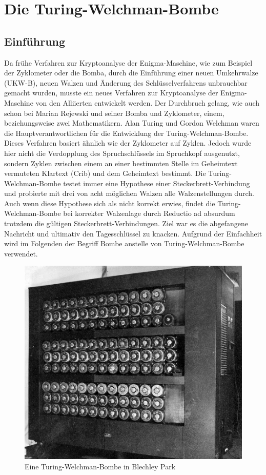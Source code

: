 \chapter{Die Turing-Welchman-Bombe}\label{ch:die-turing-bombe}

\section{Einführung}\label{sec:einfuerung_bombe}

Da frühe Verfahren zur Kryptoanalyse der Enigma-Maschine, wie zum Beispiel der \glqq Zyklometer\grqq{} oder die \glqq Bomba\grqq{}, durch die Einführung einer neuen Umkehrwalze (UKW-B), neuen Walzen und Änderung des Schlüsselverfahrens unbrauchbar gemacht wurden, musste ein neues Verfahren zur Kryptoanalyse der Enigma-Maschine von den Alliierten entwickelt werden. 
Der Durchbruch gelang, wie auch schon bei Marian Rejewski und seiner Bomba und Zyklometer, einem, beziehungsweise zwei Mathematikern.
Alan Turing und Gordon Welchman waren die Hauptverantwortlichen für die Entwicklung der \glqq Turing-Welchman-Bombe\grqq. 
Dieses Verfahren basiert ähnlich wie der Zyklometer auf \glqq Zyklen\grqq. 
Jedoch wurde hier nicht die Verdopplung des Spruchschlüssels im Spruchkopf ausgenutzt, sondern Zyklen zwischen einem an einer bestimmten Stelle im Geheimtext vermuteten Klartext (Crib) und dem Geheimtext bestimmt.
Die Turing-Welchman-Bombe testet immer eine Hypothese einer Steckerbrett-Verbindung und probierte mit drei von acht möglichen Walzen alle Walzenstellungen durch.
Auch wenn diese Hypothese sich als nicht korrekt erwies, findet die Turing-Welchman-Bombe bei korrekter Walzenlage durch Reductio ad absurdum trotzdem die gültigen Steckerbrett-Verbindungen.
Ziel war es die abgefangene Nachricht und ultimativ den Tagesschlüssel zu knacken.
Aufgrund der Einfachheit wird im Folgenden der Begriff \glqq Bombe\grqq{} anstelle von \glqq Turing-Welchman-Bombe\grqq{} verwendet.
\nopagebreak
\begin{figure}
	\centering
	\includegraphics[width=0.4\linewidth]{BletchleyParkBombe}
	\caption{Eine Turing-Welchman-Bombe in Blechley Park\autocite{wiki:bombe_picture}}
	\label{fig:bombe}
\end{figure}


